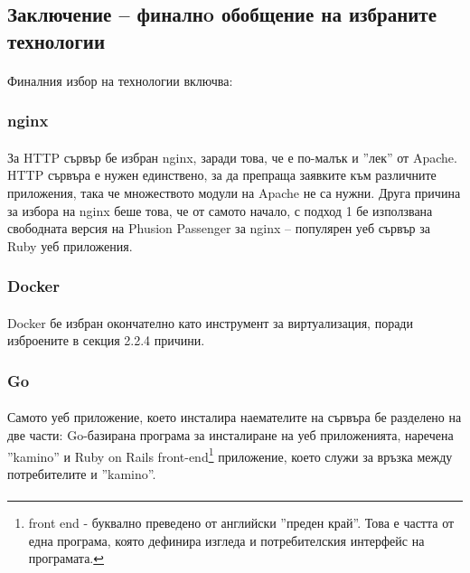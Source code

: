\documentclass[pdftex,14pt,a4paper]{extreport}
\begin{document}
\subsection {Заключение – финалнo обобщение на избраните технологии}
\paragraph {}
Финалния избор на технологии включва:
\subsubsection {nginx}
\paragraph {}
За HTTP сървър бе избран nginx, заради това, че е по-малък и ''лек'' от Apache. HTTP сървъра е нужен единствено, за да препраща заявките към различните приложения, така че множеството модули на Apache не са нужни. Друга причина за избора на nginx беше това, че от самото начало, с подход 1 бе използвана свободната версия на Phusion Passenger за nginx – популярен уеб сървър за Ruby уеб приложения.
\subsubsection {Docker}
\paragraph {}
Docker бе избран окончателно като инструмент за виртуализация, поради изброените в секция 2.2.4 причини.
\subsubsection {Go}
\paragraph {}
Самото уеб приложение, което инсталира наемателите на сървъра бе разделено на две части: Go-базирана програма за инсталиране на уеб приложенията, наречена ''kamino'' и Ruby on Rails front-end\footnote {front end - буквално преведено от английски ''преден край''. Това е частта от една програма, която дефинира изгледа и потребителския интерфейс на програмата.} приложение, което служи за връзка между потребителите и ''kamino''.
\paragraph {}
\end{document}
